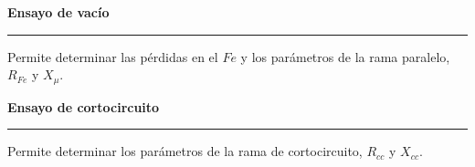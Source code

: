 \documentclass[11pt,a4paper]{article}
\newcommand{\subtitulo}[1]{
	\textbf{#1} \\ \vspace{.1cm} {\color{gray} \hrule}
}
\begin{document}
\begin{cajita}
	\begin{multicols}{2}
		\subtitulo{Ensayo de vacío}
		
			\begin{flushleft}
				Permite determinar las pérdidas en el $Fe$
				y los parámetros de la rama paralelo, $R_{Fe}$ y $X_\mu$.
			\end{flushleft}
		
		\subtitulo{Ensayo de cortocircuito}
		
			\begin{flushleft}
				Permite determinar los parámetros de la rama de cortocircuito,  $R_{cc}$ y $X_{cc}$.
			\end{flushleft}
		
	\end{multicols}	

\end{cajita}
	
\end{document}
